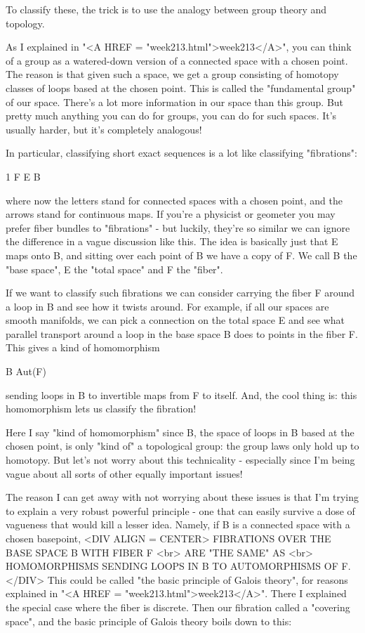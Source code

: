 To classify these, the trick is to use the analogy between group theory 
and topology. 
 
As I explained in "<A HREF = "week213.html">week213</A>", you can think of a group as a watered-down 
version of a connected space with a chosen point.  The reason is that
given such a space, we get a group consisting of homotopy classes of 
loops based at the chosen point.  This is called the "fundamental group"
of our space.  There's a lot more information in our space than this group.  
But pretty much anything you can do for groups, you can do for such spaces. 
It's usually harder, but it's completely analogous!

In particular, classifying short exact sequences is a lot like 
classifying "fibrations":

1 \to  F \to  E \to  B 

where now the letters stand for connected spaces with a chosen point, and 
the arrows stand for continuous maps.   If you're a physicist or geometer 
you may prefer fiber bundles to "fibrations" - but luckily, they're so
similar we can ignore the difference in a vague discussion like this.
The idea is basically just that E maps onto B, and sitting over each point 
of B we have a copy of F.  We call B the "base space", E the "total space" 
and F the "fiber".

If we want to classify such fibrations we can consider carrying the fiber
F around a loop in B and see how it twists around.  For example, if all our
spaces are smooth manifolds, we can pick a connection on the total space
E and see what parallel transport around a loop in the base space B does 
to points in the fiber F.  This gives a kind of homomorphism

\Omega B \to  Aut(F)

sending loops in B to invertible maps from F to itself.  And, the cool
thing is: this homomorphism lets us classify the fibration!

Here I say "kind of homomorphism" since 
\Omega B, the space of loops in B 
based at the chosen point, is only "kind of" a topological group: the 
group laws only hold up to homotopy.  But let's not worry about this 
technicality  - especially since I'm being vague about all sorts of other 
equally important issues!

The reason I can get away with not worrying about these issues is that 
I'm trying to explain a very robust powerful principle - one that can 
easily survive a dose of vagueness that would kill a lesser idea.  Namely, 
if B is a connected space with a chosen basepoint,
<DIV ALIGN = CENTER>
               FIBRATIONS OVER THE BASE SPACE B WITH FIBER F  <br>
                          ARE "THE SAME" AS <br>
         HOMOMORPHISMS SENDING LOOPS IN B TO AUTOMORPHISMS OF F.
</DIV>
This could be called "the basic principle of Galois theory", for reasons
explained in "<A HREF = "week213.html">week213</A>".  There I explained the special case where the 
fiber is discrete.  Then our fibration called a "covering space", and 
the basic principle of Galois theory boils down to this:

